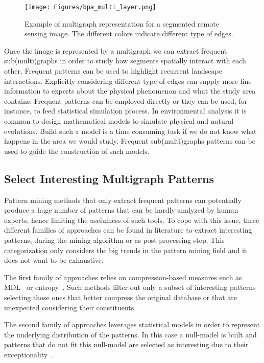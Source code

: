 \begin{figure}[!ht]
\begin{center}
	\texttt{[image: Figures/bpa\_multi\_layer.png]}
\end{center}
\caption{Example of multigraph representation for a segmented remote sensing image. The different colors indicate different type of edges.  \label{fig:multigraphExample}}
\end{figure}

Once the image is represented by a multigraph we can extract frequent sub(multi)graphs in order to study how segments spatially interact with each other. Frequent patterns can be used to highlight recurrent landscape interactions. Explicitly considering different type of edges can supply more fine information to experts about the physical phenomenon and what the study area contains. Frequent patterns can be employed directly or they can be used, for instance, to feed statistical simulation process. In environmental analysis it is common to design mathematical models to simulate physical and natural evolutions. Build such a model is a time consuming task if we do not know what happens in the area we would study. Frequent sub(multi)graphs patterns can be used to guide the construction of such models.




\subsection{Select Interesting Multigraph Patterns}

Pattern mining methods that only extract frequent patterns can potentially produce a huge number of patterns that can be hardly analyzed by human experts, hence limiting the usefulness of such tools.
To cope with this issue, three different families of approaches can be found in literature to extract interesting patterns, during the mining algorithm or as post-processing step. This categorization only considers the big trends in the pattern mining field and it does not want to be exhaustive.

The first family of approaches relies on compression-based measures such as MDL~\cite{VreekenLS11} or entropy~\cite{Tatti08}. Such methods filter out only a subset of interesting patterns selecting those ones that better compress the original database or that are unexpected considering their constituents. 

The second family of approaches leverages statistical models in order to represent the underlying distribution of the patterns. In this case a null-model is built and patterns that do not fit this null-model are selected as interesting due to their exceptionality~\cite{TattiM10,Low-KamRKP13}. 

